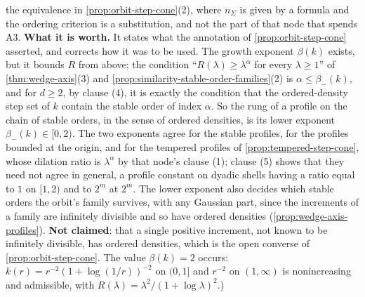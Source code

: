 \begin{lemma}
{the equivalence in \ref{prop:orbit-step-cone}(2), where $n_\Sigma$ is given by a formula and the ordering
criterion is a substitution, and not the part of that node that spends A3. \textbf{What it is
worth.} It states what the annotation of \ref{prop:orbit-step-cone} asserted, and corrects how it was
to be used. The growth exponent $\beta(k)$ exists, but it bounds $R$ from above; the condition
``$R(\lambda) \ge \lambda^\alpha$ for every $\lambda \ge 1$'' of \ref{thm:wedge-axis}(3) and
\ref{prop:similarity-stable-order-families}(2) is $\alpha \le \beta_-(k)$, and for $d \ge 2$, by clause (4),
it is exactly the condition that the ordered-density step set of $k$ contain the stable order of index $\alpha$.
So the rung of a profile on the chain of stable orders, in the sense of ordered densities, is its lower
exponent $\beta_-(k) \in [0, 2)$. The two exponents agree for the stable profiles, for the profiles
bounded at the origin, and for the tempered profiles of \ref{prop:tempered-step-cone}, whose dilation
ratio is $\lambda^\alpha$ by that node's clause (1); clause (5) shows that they need not agree in
general, a profile constant on dyadic shells having a ratio equal to $1$ on $[1, 2)$ and to $2^m$ at
$2^m$. The lower exponent also decides which stable orders the orbit's
family survives, with any Gaussian part, since the increments of a family are infinitely divisible and so have ordered densities
(\ref{prop:wedge-axis-profiles}). \textbf{Not claimed}: that a single positive increment, not known to be
infinitely divisible, has ordered densities, which is the open converse of \ref{prop:orbit-step-cone}. The
value $\beta(k) = 2$ occurs: $k(r) = r^{-2}(1 + \log(1/r))^{-2}$ on $(0, 1]$ and $r^{-2}$ on $(1, \infty)$
is nonincreasing and admissible, with $R(\lambda) = \lambda^2/(1 + \log\lambda)^2$.)}
\end{lemma}

